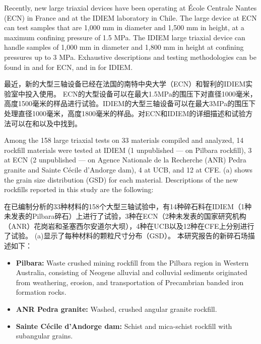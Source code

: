 \begin{ParaColumn}
    
    Recently, new large triaxial devices have been operating at École Centrale Nantes (ECN) in France and at the IDIEM laboratory in Chile. The large device at ECN can test samples that are 1,000 mm in diameter and 1,500 mm in height, at a maximum confining pressure of 1.5 MPa. The IDIEM large triaxial device can handle samples of 1,000 mm in diameter and 1,800 mm in height at confining pressures up to 3 MPa. Exhaustive descriptions and testing methodologies can be found in \citet{Hu2011} and \citet{Ovalle2013} for ECN, and in \citet{DelaHozAlvarez2007} for IDIEM.

    \switchcolumn

    最近，新的大型三轴设备已经在法国的南特中央大学（ECN）和智利的IDIEM实验室中投入使用。 ECN的大型设备可以在最大1.5MPa的围压下对直径1000毫米，高度1500毫米的样品进行试验。IDIEM的大型三轴设备可以在最大3MPa的围压下处理直径1000毫米，高度1800毫米的样品。对ECN和IDIEM的详细描述和试验方法可以在\citet{Hu2011}和\citet{Ovalle2013}以及\citet{DelaHozAlvarez2007}中找到。

    \CrossColumnText{
        
    }

    \switchcolumn*

    Among the 158 large triaxial tests on 33 materials compiled and analyzed, 14 rockfill materials were tested at IDIEM (1 unpublished — on Pilbara rockfill), 3 at ECN (2 unpublished — on Agence Nationale de la Recherche (ANR) Pedra granite and Sainte Cécile d’Andorge dam), 4 at UCB, and 12 at CFE. (a) shows the grain size distribution (GSD) for each material. Descriptions of the new rockfills reported in this study are the following:

    \switchcolumn

    在已编制分析的33种材料的158个大型三轴试验中，有14种碎石料在IDIEM（1种未发表的Pilbara碎石）上进行了试验，3种在ECN（2种未发表的国家研究机构（ANR）花岗岩和圣塞西尔安道尔大坝），4种在UCB以及12种在CFE上分别进行了试验。 (a)显示了每种材料的颗粒尺寸分布（GSD）。 本研究报告的新碎石场描述如下：

    \switchcolumn*

    \begin{itemize}
        \item \textbf{Pilbara:} Waste crushed mining rockfill from the Pilbara region in Western Australia, consisting of Neogene alluvial and colluvial sediments originated from weathering, erosion, and transportation of Precambrian banded iron formation rocks.
        \item \textbf{ANR Pedra granite:} Washed, crushed angular granite rockfill.\\[-5mm]
        \item \textbf{Sainte Cécile d’Andorge dam:} Schist and mica-schist rockfill with subangular grains.
    \end{itemize}


\end{ParaColumn}
